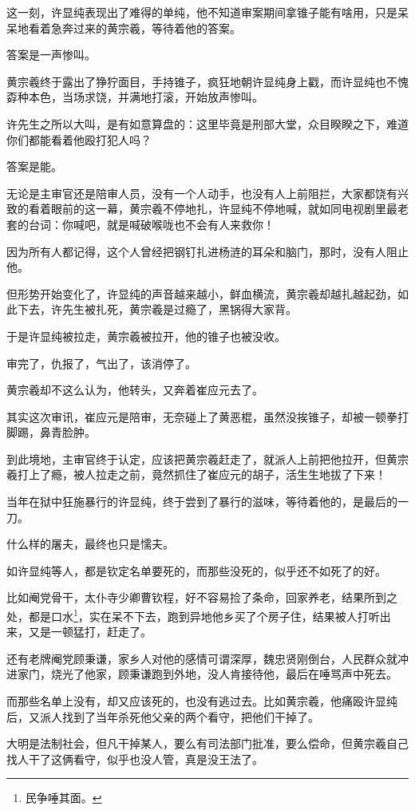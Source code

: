 \begin{multicols}{\theparacolNo}
		这一刻，许显纯表现出了难得的单纯，他不知道审案期间拿锥子能有啥用，只是呆呆地看着急奔过来的黄宗羲，等待着他的答案。

		答案是一声惨叫。

		黄宗羲终于露出了狰狞面目，手持锥子，疯狂地朝许显纯身上戳，而许显纯也不愧孬种本色，当场求饶，并满地打滚，开始放声惨叫。

		许先生之所以大叫，是有如意算盘的：这里毕竟是刑部大堂，众目睽睽之下，难道你们都能看着他殴打犯人吗？

		答案是能。

		无论是主审官还是陪审人员，没有一个人动手，也没有人上前阻拦，大家都饶有兴致的看着眼前的这一幕，黄宗羲不停地扎，许显纯不停地喊，就如同电视剧里最老套的台词：你喊吧，就是喊破喉咙也不会有人来救你！

		因为所有人都记得，这个人曾经把钢钉扎进杨涟的耳朵和脑门，那时，没有人阻止他。

		但形势开始变化了，许显纯的声音越来越小，鲜血横流，黄宗羲却越扎越起劲，如此下去，许先生被扎死，黄宗羲是过瘾了，黑锅得大家背。

		于是许显纯被拉走，黄宗羲被拉开，他的锥子也被没收。

		审完了，仇报了，气出了，该消停了。

		黄宗羲却不这么认为，他转头，又奔着崔应元去了。

		其实这次审讯，崔应元是陪审，无奈碰上了黄恶棍，虽然没挨锥子，却被一顿拳打脚踢，鼻青脸肿。

		到此境地，主审官终于认定，应该把黄宗羲赶走了，就派人上前把他拉开，但黄宗羲打上了瘾，被人拉走之前，竟然抓住了崔应元的胡子，活生生地拔了下来！

		当年在狱中狂施暴行的许显纯，终于尝到了暴行的滋味，等待着他的，是最后的一刀。

		什么样的屠夫，最终也只是懦夫。

		如许显纯等人，都是钦定名单要死的，而那些没死的，似乎还不如死了的好。

		比如阉党骨干，太仆寺少卿曹钦程，好不容易捡了条命，回家养老，结果所到之处，都是口水\footnote{民争唾其面。}，实在呆不下去，跑到异地他乡买了个房子住，结果被人打听出来，又是一顿猛打，赶走了。

		还有老牌阉党顾秉谦，家乡人对他的感情可谓深厚，魏忠贤刚倒台，人民群众就冲进家门，烧光了他家，顾秉谦跑到外地，没人肯接待他，最后在唾骂声中死去。

		而那些名单上没有，却又应该死的，也没有逃过去。比如黄宗羲，他痛殴许显纯后，又派人找到了当年杀死他父亲的两个看守，把他们干掉了。

		大明是法制社会，但凡干掉某人，要么有司法部门批准，要么偿命，但黄宗羲自己找人干了这俩看守，似乎也没人管，真是没王法了。


\end{multicols}
